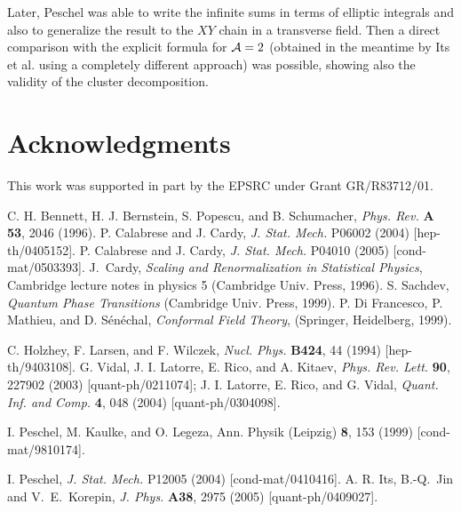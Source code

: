\documentclass[12pt]{article}
\begin{document}
Later, Peschel\cite{p-05} was able to write the infinite sums in terms of 
elliptic integrals and also to generalize the result to the $XY$ chain 
in a transverse field. 
Then a direct comparison with the explicit formula for ${\cal A}=2$ (obtained
in the meantime by Its et al.\cite{ijk-04} using a completely different
approach) was possible, showing also the validity of the 
cluster decomposition.





\section*{Acknowledgments}

This work was supported in part by the EPSRC under Grant GR/R83712/01.


\begin{thebibliography}{0}

C. H. Bennett, H. J. Bernstein, S. Popescu, and B. Schumacher,
{\it Phys. Rev.}  {\bf A 53}, 2046 (1996).
%
 P. Calabrese and J. Cardy, {\it J. Stat. Mech.} 
P06002 (2004) [hep-th/0405152].
%
 P. Calabrese and J. Cardy, {\it J. Stat. Mech.} 
P04010 (2005) [cond-mat/0503393].
%
J.~Cardy, {\it Scaling and Renormalization in Statistical Physics}, Cambridge 
lecture notes in physics 5 (Cambridge Univ. Press, 1996).
%
 S. Sachdev, {\em Quantum Phase Transitions} (Cambridge
Univ. Press, 1999).
%
P. Di Francesco, P. Mathieu, and D. S\'en\'echal, 
{\it Conformal Field Theory}, (Springer, Heidelberg, 1999).

 C. Holzhey, F. Larsen, and F. Wilczek,
{\it Nucl. Phys.}  {\bf B424}, 44 (1994) [hep-th/9403108].
%
G. Vidal, J. I. Latorre, E. Rico, and A. Kitaev,
{\it Phys. Rev. Lett.} {\bf 90}, 227902 (2003) [quant-ph/0211074];
J. I. Latorre, E. Rico, and G. Vidal,
{\it Quant. Inf. and Comp.} {\bf 4}, 048 (2004) [quant-ph/0304098].


 I. Peschel, M. Kaulke, and O. Legeza,
Ann. Physik (Leipzig) {\bf 8}, 153 (1999) [cond-mat/9810174].

%
I. Peschel, {\it J. Stat. Mech.} P12005 (2004) [cond-mat/0410416].
%
A. R. Its, B.-Q.~Jin and V.~E.~Korepin, 
{\it J. Phys.} {\bf A38}, 2975 (2005) [quant-ph/0409027].

\end{thebibliography}
\end{document}
